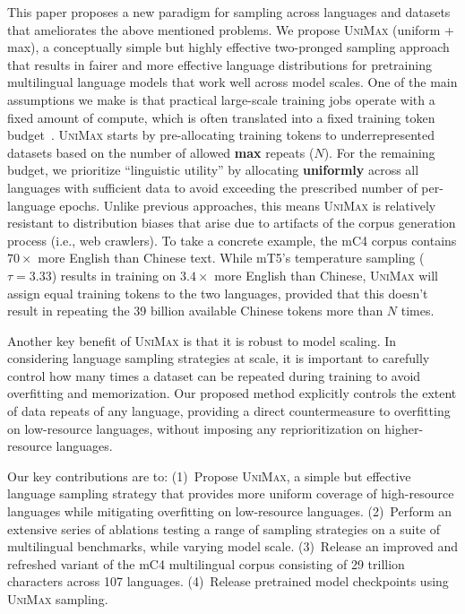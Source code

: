 \documentclass{article} %
\newcommand{\unimax}{\textsc{UniMax}}
\begin{document}
This paper proposes a new paradigm for sampling across languages and datasets that ameliorates the above mentioned problems. We propose \unimax{} (uniform + max), a conceptually simple but highly effective two-pronged sampling approach that results in fairer and more effective language distributions for pretraining multilingual language models that work well across model scales. One of the main assumptions we make is that practical large-scale training jobs operate with a fixed amount of compute, which is often translated into a fixed training token budget~\citep{raffel_t5}. \unimax{} starts by pre-allocating training tokens to underrepresented datasets based on the number of allowed \textbf{max} repeats ($N$). For the remaining budget, we prioritize ``linguistic utility'' \citep{blasi-etal-2022-systematic} by allocating \textbf{uniformly} across all languages with sufficient data to avoid exceeding the prescribed number of per-language epochs. Unlike previous approaches, this means \unimax{} is relatively resistant to distribution biases that arise due to artifacts of the corpus generation process (i.e., web crawlers). To take a concrete example, the mC4 corpus contains $70\times$ more English than Chinese text. While mT5's temperature sampling ($\tau=3.33$) results in training on $3.4\times$ more English than Chinese, \unimax{} will assign equal training tokens to the two languages, provided that this doesn't result in repeating the 39 billion available Chinese tokens more than $N$ times.

Another key benefit of \unimax{} is that it is robust to model scaling. In considering language sampling strategies at scale, it is important to carefully control how many times a dataset can be repeated during training to avoid overfitting and memorization. Our proposed method explicitly controls the extent of data repeats of any language, providing a direct countermeasure to overfitting on low-resource languages, without imposing any reprioritization on higher-resource languages.

Our key contributions are to: (1)~Propose \unimax{}, a simple but effective language sampling strategy that provides more uniform coverage of high-resource languages while mitigating overfitting on low-resource languages. (2)~Perform an extensive series of ablations testing a range of sampling strategies on a suite of multilingual benchmarks, while varying model scale. (3)~Release an improved and refreshed variant of the mC4 multilingual corpus consisting of 29 trillion characters across 107 languages. (4)~Release pretrained model checkpoints using \unimax{} sampling.
\end{document}
